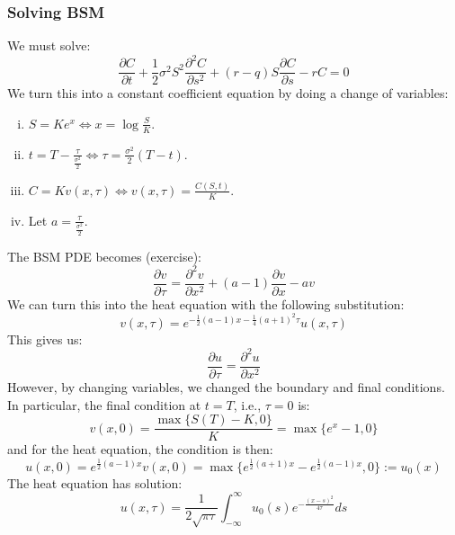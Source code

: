 \subsubsection{Solving BSM}
We must solve:
\begin{equation*}
    \frac{\partial C}{\partial t} + \frac{1}{2}\sigma^2 S^2 \frac{\partial^2C}{\partial s^2} + (r-q)S\frac{\partial C}{\partial s} - rC = 0
\end{equation*}
We turn this into a constant coefficient equation by doing a change of variables:
\begin{enumerate}[i.]
    \item \(S = Ke^x \Leftrightarrow x = \log \frac{S}{K}\).
    \item \(t = T - \frac{\tau}{\frac{\sigma^2}{2}} \Leftrightarrow \tau = \frac{\sigma^2}{2}(T-t)\).
    \item \(C = Kv(x, \tau) \Leftrightarrow v(x, \tau) = \frac{C(S,t)}{K}\).
    \item Let \(a = \frac{\tau}{\frac{\sigma^2}{2}}\).
\end{enumerate}
The BSM PDE becomes (exercise):
\begin{equation*}
    \frac{\partial v}{\partial \tau} = \frac{\partial^2v}{\partial x^2} + (a-1)\frac{\partial v}{\partial x} - av
\end{equation*}
We can turn this into the heat equation with the following substitution:
\begin{equation*}
    v(x,\tau) = e^{-\frac{1}{2}(a-1)x - \frac{1}{4}(a+1)^2\tau}u(x, \tau)
\end{equation*}
This gives us:
\begin{equation*}
    \frac{\partial u}{\partial \tau } = \frac{\partial ^2 u }{\partial x^2}
\end{equation*}
However, by changing variables, we changed the boundary and final conditions. In particular, the final condition at \(t = T\), i.e., \(\tau = 0\) is:
\begin{equation*}
    v(x,0) = \frac{\max{\{S(T)-K, 0}\}}{K} = \max\{e^x - 1, 0\}
\end{equation*}
and for the heat equation, the condition is then:
\begin{equation*}
    u(x,0) = e^{\frac{1}{2}(a-1)x}v(x,0) = \max\{e^{\frac{1}{2}(a+1)x}-e^{\frac{1}{2}(a-1)x}, 0\} := u_0(x)
\end{equation*}
The heat equation has solution:
\begin{equation*}
    u(x,\tau) = \frac{1}{2\sqrt{\pi \tau}}\int_{-\infty}^{\infty} u_0(s)e^{-\frac{(x-s)^2}{4\tau}}ds
\end{equation*}

